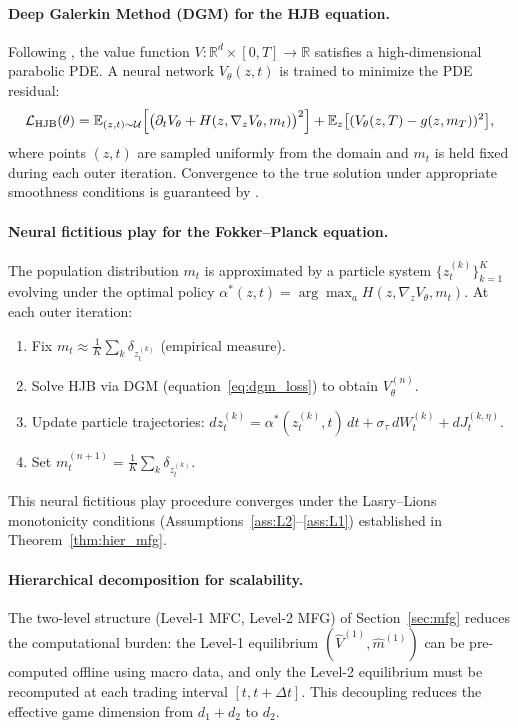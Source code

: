 \documentclass[12pt,a4paper]{article}
\theoremstyle{plain}
\theoremstyle{definition}
\newcommand{\R}{\mathbb{R}}
\newcommand{\1}{\mathbbm{1}}
\begin{document}
\paragraph{Deep Galerkin Method (DGM) for the HJB equation.}
Following \citet{SirignanoSpiliopoulos2018DGM}, the value function
$V: \R^d \times [0,T] \to \R$ satisfies a high-dimensional parabolic PDE.
A neural network $V_\theta(z, t)$ is trained to minimize the PDE residual:
\begin{equation}
\label{eq:dgm_loss}
\mathcal{L}_\mathrm{HJB}(\theta)
= \mathbb{E}_{(z,t) \sim \mathcal{U}}\Bigl[
  \bigl(\partial_t V_\theta + H(z, \nabla_z V_\theta, m_t)\bigr)^2
\Bigr]
+ \mathbb{E}_{z}\bigl[(V_\theta(z,T) - g(z, m_T))^2\bigr],
\end{equation}
where points $(z, t)$ are sampled uniformly from the domain and $m_t$ is held
fixed during each outer iteration.  Convergence to the true solution under
appropriate smoothness conditions is guaranteed by \citet{SirignanoSpiliopoulos2018DGM}.

\paragraph{Neural fictitious play for the Fokker–Planck equation.}
The population distribution $m_t$ is approximated by a particle system
$\{z^{(k)}_t\}_{k=1}^K$ evolving under the optimal policy $\alpha^*(z, t) =
\arg\max_a H(z, \nabla_z V_\theta, m_t)$.  At each outer iteration:
\begin{enumerate}
\item Fix $m_t \approx \frac{1}{K}\sum_k \delta_{z^{(k)}_t}$ (empirical measure).
\item Solve HJB via DGM (equation~\eqref{eq:dgm_loss}) to obtain $V^{(n)}_\theta$.
\item Update particle trajectories:
  $dz^{(k)}_t = \alpha^*(z^{(k)}_t, t)\,dt + \sigma_\tau\,dW^{(k)}_t + dJ^{(k,\eta)}_t$.
\item Set $m^{(n+1)}_t = \frac{1}{K}\sum_k \delta_{z^{(k)}_t}$.
\end{enumerate}
This neural fictitious play procedure converges under the Lasry–Lions monotonicity
conditions (Assumptions~\ref{ass:L2}--\ref{ass:L1}) established in Theorem~\ref{thm:hier_mfg}.

\paragraph{Hierarchical decomposition for scalability.}
The two-level structure (Level-1 MFC, Level-2 MFG) of Section~\ref{sec:mfg}
reduces the computational burden: the Level-1 equilibrium $(\hat V^{(1)}, \hat m^{(1)})$
can be pre-computed offline using macro data, and only the Level-2 equilibrium
must be recomputed at each trading interval $[t, t+\Delta t]$.  This decoupling
reduces the effective game dimension from $d_1 + d_2$ to $d_2$.
\end{document}
